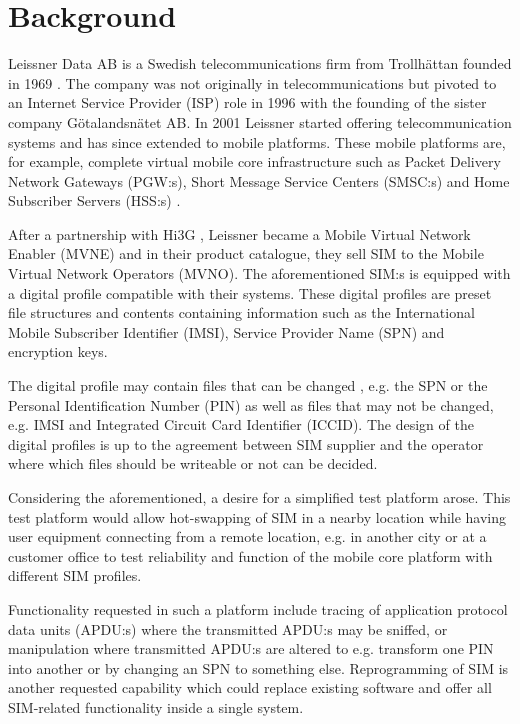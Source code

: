 \section{Background}

Leissner Data AB is a Swedish telecommunications firm from
Trollhättan founded in 1969 \cite{leissner-about}. The company
was not originally in telecommunications but pivoted to an 
Internet Service Provider (ISP) role in 1996 with the founding of
the sister company Götalandsnätet AB. In 2001 Leissner started
offering telecommunication systems and has since extended to mobile
platforms. These mobile platforms are, for example, complete
virtual mobile core infrastructure such as Packet Delivery Network
Gateways (PGW:s), Short Message Service Centers (SMSC:s) and Home
Subscriber Servers (HSS:s) \cite{leissner-mobile-core}.

After a partnership with Hi3G \cite{leissner-about}, Leissner
became a Mobile Virtual Network Enabler (MVNE) and in their
product catalogue, they sell SIM to the Mobile Virtual Network
Operators (MVNO). The aforementioned SIM:s is equipped with a
digital profile compatible with their systems. These digital
profiles are preset file structures and contents containing
information such as the International Mobile Subscriber Identifier
(IMSI), Service Provider Name (SPN) and encryption keys.

The digital profile may contain files that can be changed \cite{placeholder-source-for-smart-card-profiles},
e.g. the SPN or the Personal Identification Number (PIN) as well as
files that may not be changed, e.g. IMSI and Integrated Circuit
Card Identifier (ICCID). The design of the digital profiles is up
to the agreement between SIM supplier and the operator where which
files should be writeable or not can be decided.

Considering the aforementioned, a desire for a simplified test
platform arose. This test platform would allow hot-swapping of
SIM in a nearby location while having user equipment connecting
from a remote location, e.g. in another city or at a customer
office to test reliability and function of the mobile core
platform with different SIM profiles.

Functionality requested in such a platform include tracing of
application protocol data units (APDU:s) where the transmitted
APDU:s may be sniffed, or manipulation where transmitted APDU:s
are altered to e.g. transform one PIN into another or by changing
an SPN to something else. Reprogramming of SIM is another
requested capability which could replace existing software and
offer all SIM-related functionality inside a single system.

